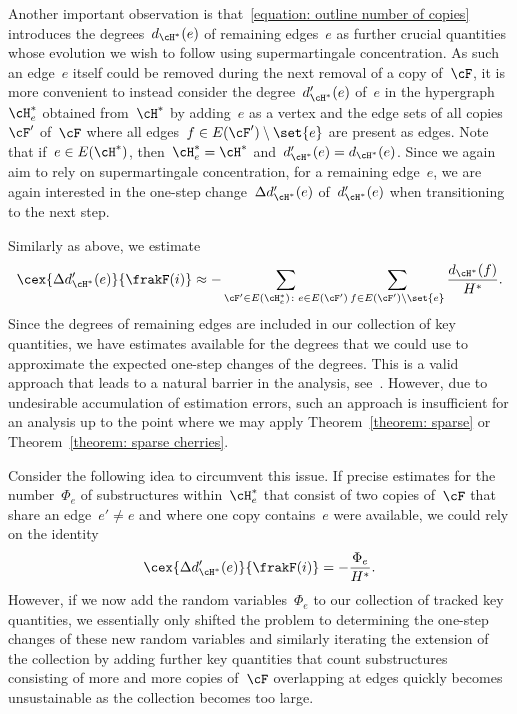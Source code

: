 \documentclass[11pt]{amsart}
\theoremstyle{definition}
\numberwithin{equation}{section}
\begin{document}
	Another important observation is that~\eqref{equation: outline number of copies} introduces the degrees~$d_{\cH^*}(e)$ of remaining edges~$e$ as further crucial quantities whose evolution we wish to follow using supermartingale concentration.
	As such an edge~$e$ itself could be removed during the next removal of a copy of~$\cF$, it is more convenient to instead consider the degree~$d_{\cH^*}'(e)$ of~$e$ in the hypergraph~$\cH^*_e$ obtained from~$\cH^*$ by adding~$e$ as a vertex and the edge sets of all copies~$\cF'$ of~$\cF$ where all edges~$f\in E(\cF')\setminus\set{e}$ are present as edges.
	Note that if~$e\in E(\cH^*)$, then~$\cH^*_e=\cH^*$ and~$d_{\cH^*}'(e)=d_{\cH^*}(e)$.
	Since we again aim to rely on supermartingale concentration, for a remaining edge~$e$, we are again interested in the one-step change~$\Delta d_{\cH^*}'(e)$ of~$d_{\cH^*}'(e)$ when transitioning to the next step.
	
	Similarly as above, we estimate
	\begin{equation*}
		\cex{\Delta d_{\cH^*}'(e)}{\frakF(i)}
		\approx-\sum_{\cF'\in E(\cH^*_e)\colon e\in E(\cF')}\sum_{f\in E(\cF')\setminus \set{e}}\frac{d_{\cH^*}(f)}{H^*}.
	\end{equation*}
	Since the degrees of remaining edges are included in our collection of key quantities, we have estimates available for the degrees that we could use to approximate the expected one-step changes of the degrees.
	This is a valid approach that leads to a natural barrier in the analysis, see~\cite{BB:19,BFL:18}.
	However, due to undesirable accumulation of estimation errors, such an approach is insufficient for an analysis up to the point where we may apply Theorem~\ref{theorem: sparse} or Theorem~\ref{theorem: sparse cherries}.
	
	Consider the following idea to circumvent this issue.
	If precise estimates for the number~$\Phi_e$ of substructures within~$\cH^*_e$ that consist of two copies of~$\cF$ that share an edge~$e'\neq e$ and where one copy contains~$e$ were available, we could rely on the identity
	\begin{equation*}
		\cex{\Delta d_{\cH^*}'(e)}{\frakF(i)}=-\frac{\Phi_e}{H^*}.
	\end{equation*}
	However, if we now add the random variables~$\Phi_e$ to our collection of tracked key quantities, we essentially only shifted the problem to determining the one-step changes of these new random variables and similarly iterating the extension of the collection by adding further key quantities that count substructures consisting of more and more copies of~$\cF$ overlapping at edges quickly becomes unsustainable as the collection becomes too large.
	
\end{document}
